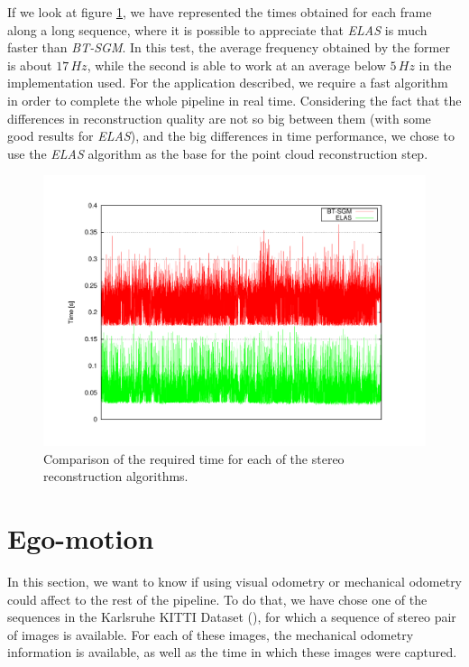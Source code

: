 If we look at figure \ref{fig:cp05_times_elas_btsgm}, we have represented the times obtained for each frame along a long sequence, where it is possible to appreciate that \emph{ELAS} is much faster than \emph{BT-SGM}. In this test, the average frequency obtained by the former is about $17\,Hz$, while the second is able to work at an average below $5\,Hz$ in the implementation used. For the application described, we require a fast algorithm in order to complete the whole pipeline in real time. Considering the fact that the differences in reconstruction quality are not so big between them (with some good results for \emph{ELAS}), and the big differences in time performance, we chose to use the \emph{ELAS} algorithm as the base for the point cloud reconstruction step.

 \begin{figure}[th]
  \centering
  \includegraphics[trim=50 50 90 60, clip]{timesELAS_OPENCV}
  \caption{Comparison of the required time for each of the stereo reconstruction algorithms.}\label{fig:cp05_times_elas_btsgm}
\end{figure}

\section{Ego-motion}\label{ch:chapter05_02_02}

In this section, we want to know if using visual odometry or mechanical odometry could affect to the rest of the pipeline. To do that, we have chose one of the sequences in the Karlsruhe KITTI Dataset (\cite{geiger2013vision}), for which a sequence of stereo pair of images is available. For each of these images, the mechanical odometry information is available, as well as the time in which these images were captured.

